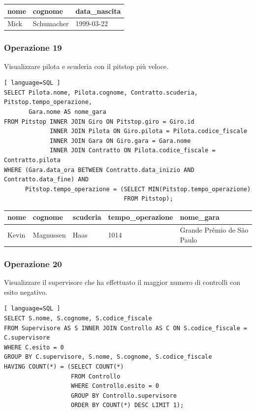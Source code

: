 \documentclass[11pt]{article}
\begin{document}
\begin{table}[H]
    \centering
    \begin{tabular}{|l|l|l|}
    \hline
        \textbf{nome} & \textbf{cognome} & \textbf{data\_nascita} \\ \hline
        Mick & Schumacher & 1999-03-22 \\ \hline
    \end{tabular}
\end{table}


\subsubsection{Operazione 19}
Visualizzare pilota e scuderia con il pitstop più veloce.
\begin{lstlisting}[ language=SQL ]
SELECT Pilota.nome, Pilota.cognome, Contratto.scuderia, Pitstop.tempo_operazione, 
       Gara.nome AS nome_gara
FROM Pitstop INNER JOIN Giro ON Pitstop.giro = Giro.id
             INNER JOIN Pilota ON Giro.pilota = Pilota.codice_fiscale
             INNER JOIN Gara ON Giro.gara = Gara.nome
             INNER JOIN Contratto ON Pilota.codice_fiscale = Contratto.pilota
WHERE (Gara.data_ora BETWEEN Contratto.data_inizio AND Contratto.data_fine) AND
      Pitstop.tempo_operazione = (SELECT MIN(Pitstop.tempo_operazione)
                                  FROM Pitstop);
\end{lstlisting}

\begin{table}[H]
    \centering
    \begin{tabular}{|l|l|l|l|l|}
    \hline
        \textbf{nome} & \textbf{cognome} & \textbf{scuderia} & \textbf{tempo\_operazione} & \textbf{nome\_gara} \\ \hline
        Kevin & Magnussen & Haas & 1014 & Grande Prêmio de São Paulo \\ \hline
    \end{tabular}
\end{table}


\subsubsection{Operazione 20}
Visualizzare il supervisore che ha effettuato il maggior numero di controlli con esito negativo.
\begin{lstlisting}[ language=SQL ]
SELECT S.nome, S.cognome, S.codice_fiscale
FROM Supervisore AS S INNER JOIN Controllo AS C ON S.codice_fiscale = C.supervisore
WHERE C.esito = 0
GROUP BY C.supervisore, S.nome, S.cognome, S.codice_fiscale
HAVING COUNT(*) = (SELECT COUNT(*)
                   FROM Controllo
                   WHERE Controllo.esito = 0
                   GROUP BY Controllo.supervisore
                   ORDER BY COUNT(*) DESC LIMIT 1);
\end{lstlisting}
\end{document}
